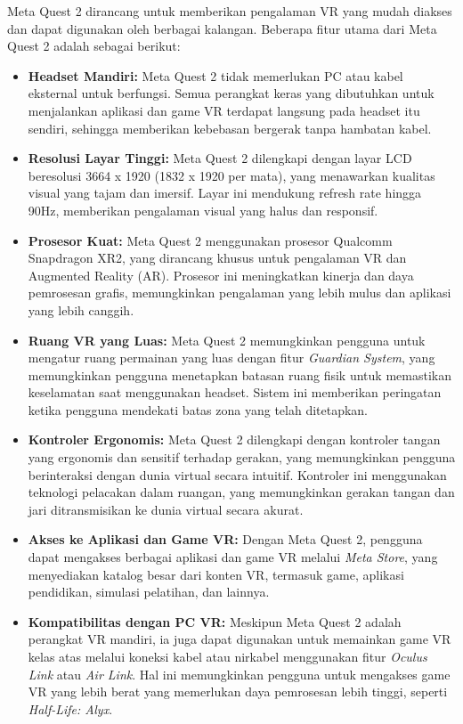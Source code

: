 Meta Quest 2 dirancang untuk memberikan pengalaman VR yang mudah diakses dan dapat digunakan oleh berbagai kalangan. Beberapa fitur utama dari Meta Quest 2 adalah sebagai berikut:

\begin{itemize}
    \item \textbf{Headset Mandiri:} Meta Quest 2 tidak memerlukan PC atau kabel eksternal untuk berfungsi. Semua perangkat keras yang dibutuhkan untuk menjalankan aplikasi dan game VR terdapat langsung pada headset itu sendiri, sehingga memberikan kebebasan bergerak tanpa hambatan kabel.
    \item \textbf{Resolusi Layar Tinggi:} Meta Quest 2 dilengkapi dengan layar LCD beresolusi 3664 x 1920 (1832 x 1920 per mata), yang menawarkan kualitas visual yang tajam dan imersif. Layar ini mendukung refresh rate hingga 90Hz, memberikan pengalaman visual yang halus dan responsif.
    \item \textbf{Prosesor Kuat:} Meta Quest 2 menggunakan prosesor Qualcomm Snapdragon XR2, yang dirancang khusus untuk pengalaman VR dan Augmented Reality (AR). Prosesor ini meningkatkan kinerja dan daya pemrosesan grafis, memungkinkan pengalaman yang lebih mulus dan aplikasi yang lebih canggih.
    \item \textbf{Ruang VR yang Luas:} Meta Quest 2 memungkinkan pengguna untuk mengatur ruang permainan yang luas dengan fitur \textit{Guardian System}, yang memungkinkan pengguna menetapkan batasan ruang fisik untuk memastikan keselamatan saat menggunakan headset. Sistem ini memberikan peringatan ketika pengguna mendekati batas zona yang telah ditetapkan.
    \item \textbf{Kontroler Ergonomis:} Meta Quest 2 dilengkapi dengan kontroler tangan yang ergonomis dan sensitif terhadap gerakan, yang memungkinkan pengguna berinteraksi dengan dunia virtual secara intuitif. Kontroler ini menggunakan teknologi pelacakan dalam ruangan, yang memungkinkan gerakan tangan dan jari ditransmisikan ke dunia virtual secara akurat.
    \item \textbf{Akses ke Aplikasi dan Game VR:} Dengan Meta Quest 2, pengguna dapat mengakses berbagai aplikasi dan game VR melalui \textit{Meta Store}, yang menyediakan katalog besar dari konten VR, termasuk game, aplikasi pendidikan, simulasi pelatihan, dan lainnya.
    \item \textbf{Kompatibilitas dengan PC VR:} Meskipun Meta Quest 2 adalah perangkat VR mandiri, ia juga dapat digunakan untuk memainkan game VR kelas atas melalui koneksi kabel atau nirkabel menggunakan fitur \textit{Oculus Link} atau \textit{Air Link}. Hal ini memungkinkan pengguna untuk mengakses game VR yang lebih berat yang memerlukan daya pemrosesan lebih tinggi, seperti \textit{Half-Life: Alyx}.
\end{itemize}

